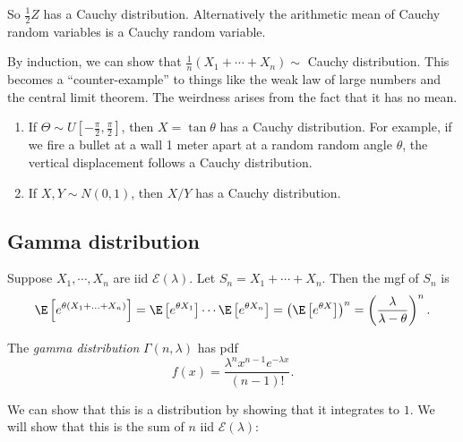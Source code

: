 \documentclass[a4paper]{article}
\begin{document}
So $\frac{1}{2}Z$ has a Cauchy distribution. Alternatively the arithmetic mean of Cauchy random variables is a Cauchy random variable.

By induction, we can show that $\frac{1}{n}(X_1 + \cdots + X_n)\sim$ Cauchy distribution. This becomes a ``counter-example'' to things like the weak law of large numbers and the central limit theorem. The weirdness arises from the fact that it has no mean.

\begin{prop}\leavevmode
  \begin{enumerate}
    \item If $\Theta\sim U[-\frac{\pi}{2}, \frac{\pi}{2}]$, then $X = \tan \theta$ has a Cauchy distribution. For example, if we fire a bullet at a wall 1 meter apart at a random random angle $\theta$, the vertical displacement follows a Cauchy distribution.

      \begin{center}
      \end{center}
    \item If $X, Y\sim N(0, 1)$, then $X/Y$ has a Cauchy distribution.
  \end{enumerate}
\end{prop}

\subsection{Gamma distribution}
\begin{eg}
  Suppose $X_1, \cdots, X_n$ are iid $\mathcal{E}(\lambda)$. Let $S_n = X_1 + \cdots + X_n$. Then the mgf of $S_n$ is
  \[
    \E\left[e^{\theta(X_1 + \ldots + X_n)}\right] = \E\left[e^{\theta X_1}\right]\cdots \E\left[e^{\theta X_n}\right] = \left(\E\left[e^{\theta X}\right]\right)^n = \left(\frac{\lambda}{\lambda - \theta}\right)^n.
  \]
\end{eg}
\begin{defi}
  The \emph{gamma distribution} $\Gamma(n, \lambda)$ has pdf
  \[
    f(x) = \frac{\lambda^n x^{n - 1}e^{-\lambda x}}{(n - 1)!}.
  \]
\end{defi}
We can show that this is a distribution by showing that it integrates to $1$.
We will show that this is the sum of $n$ iid $\mathcal{E}(\lambda)$:
\end{document}
